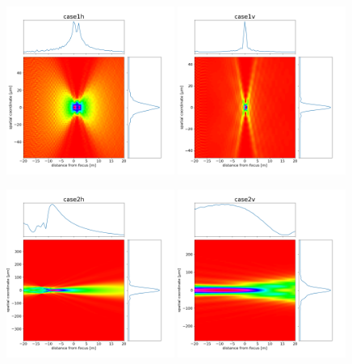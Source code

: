 \documentclass{iucr}              %
\begin{document}
\begin{figure}\label{fig:caustic}
\centering

\includegraphics[width=0.49\textwidth]{figures/case1h_caustic.png}
\includegraphics[width=0.49\textwidth]{figures/case1v_caustic.png}

\includegraphics[width=0.49\textwidth]{figures/case2h_caustic.png}
\includegraphics[width=0.49\textwidth]{figures/case2v_caustic.png}


\end{figure}
\end{document}
